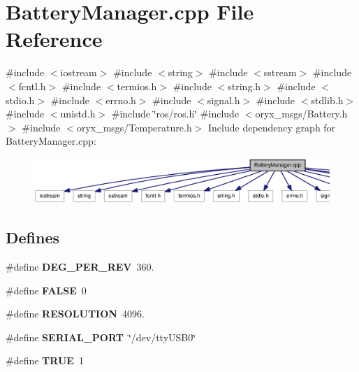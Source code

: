 \section{\-Battery\-Manager.\-cpp \-File \-Reference}
\label{BatteryManager_8cpp}
{\ttfamily \#include $<$iostream$>$}\*
{\ttfamily \#include $<$string$>$}\*
{\ttfamily \#include $<$sstream$>$}\*
{\ttfamily \#include $<$fcntl.\-h$>$}\*
{\ttfamily \#include $<$termios.\-h$>$}\*
{\ttfamily \#include $<$string.\-h$>$}\*
{\ttfamily \#include $<$stdio.\-h$>$}\*
{\ttfamily \#include $<$errno.\-h$>$}\*
{\ttfamily \#include $<$signal.\-h$>$}\*
{\ttfamily \#include $<$stdlib.\-h$>$}\*
{\ttfamily \#include $<$unistd.\-h$>$}\*
{\ttfamily \#include \char`\"{}ros/ros.\-h\char`\"{}}\*
{\ttfamily \#include $<$oryx\-\_\-msgs/\-Battery.\-h$>$}\*
{\ttfamily \#include $<$oryx\-\_\-msgs/\-Temperature.\-h$>$}\*
\-Include dependency graph for \-Battery\-Manager.\-cpp\-:
\nopagebreak
\begin{figure}[H]
\begin{center}
\leavevmode
\includegraphics[width=350pt]{BatteryManager_8cpp__incl}
\end{center}
\end{figure}
\subsection*{\-Defines}
\begin{DoxyCompactItemize}
\item 
\#define {\bf \-D\-E\-G\-\_\-\-P\-E\-R\-\_\-\-R\-E\-V}~360.
\item 
\#define {\bf \-F\-A\-L\-S\-E}~0
\item 
\#define {\bf \-R\-E\-S\-O\-L\-U\-T\-I\-O\-N}~4096.
\item 
\#define {\bf \-S\-E\-R\-I\-A\-L\-\_\-\-P\-O\-R\-T}~\char`\"{}/dev/tty\-U\-S\-B0\char`\"{}
\item 
\#define {\bf \-T\-R\-U\-E}~1
\end{DoxyCompactItemize}
